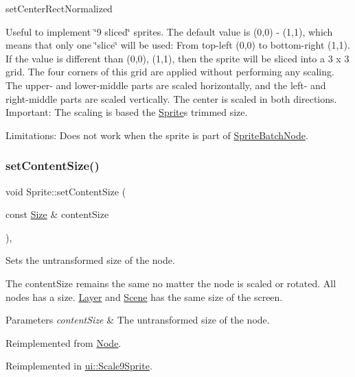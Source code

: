 set\+Center\+Rect\+Normalized

Useful to implement \char`\"{}9 sliced\char`\"{} sprites. The default value is (0,0) -\/ (1,1), which means that only one \char`\"{}slice\char`\"{} will be used\+: From top-\/left (0,0) to bottom-\/right (1,1). If the value is different than (0,0), (1,1), then the sprite will be sliced into a 3 x 3 grid. The four corners of this grid are applied without performing any scaling. The upper-\/ and lower-\/middle parts are scaled horizontally, and the left-\/ and right-\/middle parts are scaled vertically. The center is scaled in both directions. Important\+: The scaling is based the \hyperlink{classSprite}{Sprite}\textquotesingle{}s trimmed size.

Limitations\+: Does not work when the sprite is part of {\ttfamily \hyperlink{classSpriteBatchNode}{Sprite\+Batch\+Node}}. \mbox{\label{classSprite_a040ac797e7c5a3a7ffee7acee8904629}} 
\subsubsection{\texorpdfstring{set\+Content\+Size()}{setContentSize()}}
{\footnotesize\ttfamily void Sprite\+::set\+Content\+Size (\begin{DoxyParamCaption}\item[{const \hyperlink{classSize}{Size} \&}]{content\+Size }\end{DoxyParamCaption})\hspace{0.3cm}{\ttfamily [override]}, {\ttfamily [virtual]}}

Sets the untransformed size of the node.

The content\+Size remains the same no matter the node is scaled or rotated. All nodes has a size. \hyperlink{classLayer}{Layer} and \hyperlink{classScene}{Scene} has the same size of the screen.


\begin{DoxyParams}{Parameters}
{\em content\+Size} & The untransformed size of the node. \\
\hline
\end{DoxyParams}


Reimplemented from \hyperlink{classNode_ade113d7fc9244f58ac98a4712da49818}{Node}.



Reimplemented in \hyperlink{classui_1_1Scale9Sprite_af7a55ebc4ba4b0da9ce2ce34bb3bda37}{ui\+::\+Scale9\+Sprite}.

